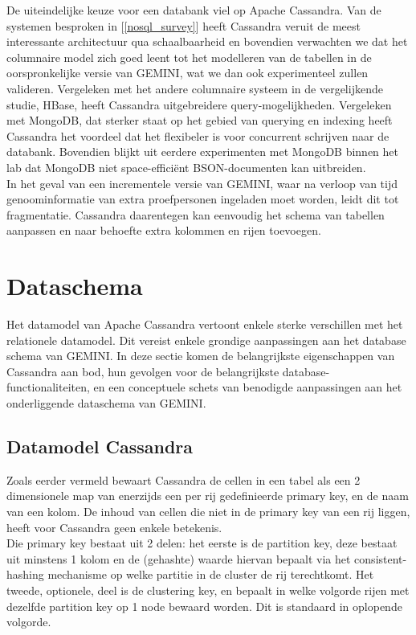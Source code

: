De uiteindelijke keuze voor een databank viel op Apache Cassandra. Van de systemen besproken in [\ref{nosql_survey}] heeft Cassandra veruit de meest interessante architectuur qua schaalbaarheid en bovendien verwachten we dat het columnaire model zich goed leent tot het modelleren van de tabellen in de oorspronkelijke versie van GEMINI, wat we dan ook experimenteel zullen valideren. Vergeleken met het andere columnaire systeem in de vergelijkende studie, HBase, heeft Cassandra uitgebreidere query-mogelijkheden. Vergeleken met MongoDB, dat sterker staat op het gebied van querying en indexing heeft Cassandra het voordeel dat het flexibeler is voor concurrent schrijven naar de databank. Bovendien blijkt uit eerdere experimenten met MongoDB binnen het lab dat MongoDB niet space-effici\"ent BSON-documenten kan uitbreiden.\\
In het geval van een incrementele versie van GEMINI, waar na verloop van tijd genoominformatie van extra proefpersonen ingeladen moet worden, leidt dit tot fragmentatie. Cassandra daarentegen kan eenvoudig het schema van tabellen aanpassen en naar behoefte extra kolommen en rijen toevoegen.

\section{Dataschema}

\label{cassandra_datamodel}

Het datamodel van Apache Cassandra vertoont enkele sterke verschillen met het relationele datamodel. Dit vereist enkele grondige aanpassingen aan het database schema van GEMINI. In deze sectie komen de belangrijkste eigenschappen van Cassandra aan bod, hun gevolgen voor de belangrijkste database-functionaliteiten, en een conceptuele schets van benodigde aanpassingen aan het onderliggende dataschema van GEMINI.

\subsection{Datamodel Cassandra}

Zoals eerder vermeld bewaart Cassandra de cellen in een tabel als een 2 dimensionele map van enerzijds een per rij gedefinieerde primary key, en de naam van een kolom. De inhoud van cellen die niet in de primary key van een rij liggen, heeft voor Cassandra geen enkele betekenis.\\
Die primary key bestaat uit 2 delen: het eerste is de partition key, deze bestaat uit minstens 1 kolom en de (gehashte) waarde hiervan bepaalt via het consistent-hashing mechanisme op welke partitie in de cluster de rij terechtkomt. Het tweede, optionele, deel is de clustering key, en bepaalt in welke volgorde rijen met dezelfde partition key op 1 node bewaard worden. Dit is standaard in oplopende volgorde.\\

